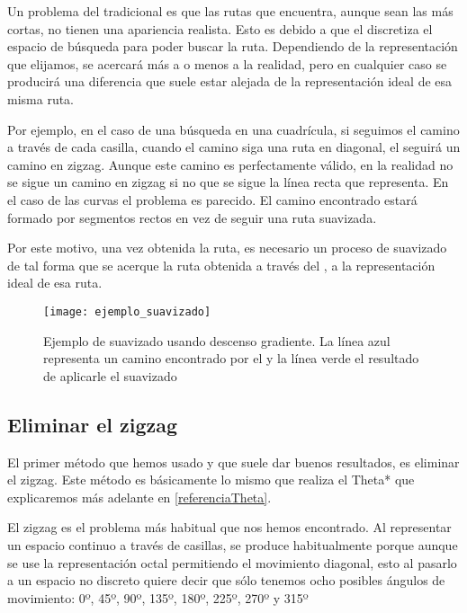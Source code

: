 Un problema del \Astar tradicional es que las rutas que encuentra, aunque sean las más cortas, no tienen una apariencia realista. Esto es debido a que el \Astar discretiza el espacio de búsqueda para poder buscar la ruta. Dependiendo de la representación que elijamos, se acercará más a o menos a la realidad, pero en cualquier caso se producirá una diferencia que suele estar alejada de la representación ideal de esa misma ruta.

Por ejemplo, en el caso de una búsqueda en una cuadrícula, si seguimos el camino a través de cada casilla, cuando el camino siga una ruta en diagonal, el \Astar seguirá un camino en zigzag. Aunque este camino es perfectamente válido, en la realidad no se sigue un camino en zigzag si no que se sigue la línea recta que representa. En el caso de las curvas el problema es parecido. El camino encontrado estará formado por segmentos rectos en vez de seguir una ruta suavizada.

Por este motivo, una vez obtenida la ruta, es necesario un proceso de suavizado de tal forma que se acerque la ruta obtenida a través del \Astar, a la representación ideal de esa ruta.

\begin{figure}[htpb]
    \centering
    \texttt{[image: ejemplo\_suavizado]}
    \caption[Ejemplo de suavizado usando descenso gradiente]{Ejemplo de suavizado usando descenso gradiente. La línea azul representa un camino encontrado por el \Astar y la línea verde el resultado de aplicarle el suavizado}
    \label{fig:basics AFM sketch}
\end{figure}

\subsection{Eliminar el zigzag}

El primer método que hemos usado y que suele dar buenos resultados, es eliminar el zigzag. Este método es básicamente lo mismo que realiza el Theta* que explicaremos más adelante en \ref{referenciaTheta}.

El zigzag es el problema más habitual que nos hemos encontrado. Al representar un espacio continuo a través de casillas, se produce habitualmente porque aunque se use la representación octal permitiendo el movimiento diagonal, esto al pasarlo a un espacio no discreto quiere decir que sólo tenemos ocho posibles ángulos de movimiento: 0º, 45º, 90º, 135º, 180º, 225º, 270º y 315º

